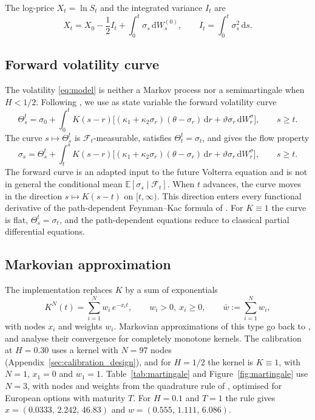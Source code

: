 \documentclass{rQUF2e}
\theoremstyle{plain}
\theoremstyle{definition}
\theoremstyle{remark}
\newcommand{\D}{\mathrm{d}}
\newcommand{\E}{\mathbb{E}}
\newcommand{\F}{\mathcal{F}}
\begin{document}
The log-price $X_t=\ln S_t$ and the integrated variance $I_t$ are
\begin{equation}\label{eq:logprice}
X_t=X_0-\frac12 I_t+\int_0^t\sigma_s\,\D W^{(0)}_s,\qquad I_t=\int_0^t\sigma_s^2\,\D s .
\end{equation}

\subsection{Forward volatility curve}

The volatility \eqref{eq:model} is neither a Markov process nor a semimartingale when $H<1/2$. Following \citet{ViensZhang2019}, we use as state variable the forward volatility curve
\begin{equation}\label{eq:theta_curve}
\Theta^t_s=\sigma_0+\int_0^t K(s-r)\Big[(\kappa_1+\kappa_2\sigma_r)(\theta-\sigma_r)\,\D r+\vartheta\sigma_r\,\D W^\sigma_r\Big],\qquad s\ge t .
\end{equation}
The curve $s\mapsto\Theta^t_s$ is $\F_t$-measurable, satisfies $\Theta^t_t=\sigma_t$, and gives the flow property
\begin{equation}\label{eq:flow}
\sigma_s=\Theta^t_s+\int_t^s K(s-r)\Big[(\kappa_1+\kappa_2\sigma_r)(\theta-\sigma_r)\,\D r+\vartheta\sigma_r\,\D W^\sigma_r\Big],\qquad s\ge t .
\end{equation}
The forward curve is an adapted input to the future Volterra equation and is not in general the conditional mean $\E[\sigma_s\mid\F_t]$. When $t$ advances, the curve moves in the direction $s\mapsto K(s-t)$ on $[t,\infty)$. This direction enters every functional derivative of the path-dependent Feynman--Kac formula of \citet{ViensZhang2019}. For $K\equiv1$ the curve is flat, $\Theta^t_s=\sigma_t$, and the path-dependent equations reduce to classical partial differential equations.

\subsection{Markovian approximation}

The implementation replaces $K$ by a sum of exponentials
\begin{equation}\label{eq:kernel_N}
K^N(t)=\sum_{i=1}^N w_i\,e^{-x_i t},\qquad w_i>0,\ x_i\ge0,\qquad \bar w:=\sum_{i=1}^N w_i ,
\end{equation}
with nodes $x_i$ and weights $w_i$. Markovian approximations of this type go back to \citet{AbiJaberElEuch2019}, and \citet{AlfonsiKebaier2024} analyse their convergence for completely monotone kernels. The calibration at $H=0.30$ uses a kernel with $N=97$ nodes (Appendix~\ref{sec:calibration_design}), and for $H=1/2$ the kernel is $K\equiv1$, with $N=1$, $x_1=0$ and $w_1=1$. Table~\ref{tab:martingale} and Figure~\ref{fig:martingale} use $N=3$, with nodes and weights from the quadrature rule of \citet{BayerBreneis2023}, optimised for European options with maturity $T$. For $H=0.1$ and $T=1$ the rule gives $x=(0.0333,\,2.242,\,46.83)$ and $w=(0.555,\,1.111,\,6.086)$.
\end{document}

